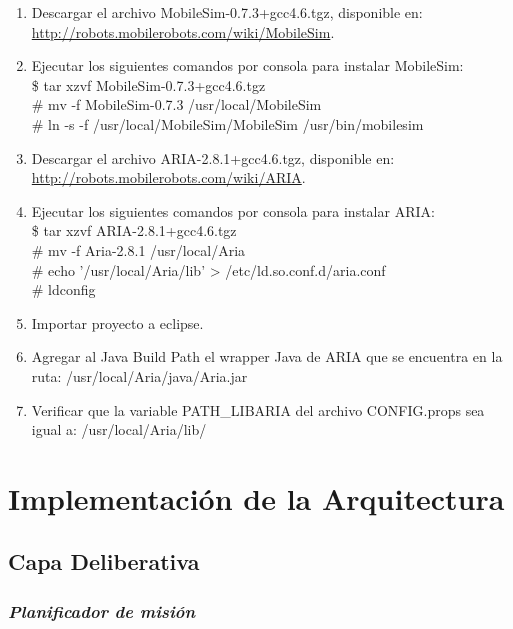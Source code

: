 \documentclass[11pt,twoside,A5]{article}
\newcommand{\sourcecode}[2][\footnotesize]{{\ttfamily#1#2}}
\newcommand{\link}[1]{{\footnotesize\url{#1}}}
\begin{document}
\begin{enumerate}
\item Descargar el archivo \sourcecode{MobileSim-0.7.3+gcc4.6.tgz}, disponible en: \\ \link{http://robots.mobilerobots.com/wiki/MobileSim}.
\item Ejecutar los siguientes comandos por consola para instalar MobileSim:
\sourcecode{ 
\\ \$ tar xzvf MobileSim-0.7.3+gcc4.6.tgz
\\ \# mv -f MobileSim-0.7.3 /usr/local/MobileSim
\\ \# ln -s -f /usr/local/MobileSim/MobileSim /usr/bin/mobilesim}
\item Descargar el archivo \sourcecode{ARIA-2.8.1+gcc4.6.tgz}, disponible en: \\ \link{http://robots.mobilerobots.com/wiki/ARIA}.
\item Ejecutar los siguientes comandos por consola para instalar ARIA:
\sourcecode{
\\ \$ tar xzvf ARIA-2.8.1+gcc4.6.tgz
\\ \# mv -f Aria-2.8.1 /usr/local/Aria
\\ \# echo '/usr/local/Aria/lib' > /etc/ld.so.conf.d/aria.conf
\\ \# ldconfig}
\item Importar proyecto a eclipse.
\item Agregar al \sourcecode{Java Build Path} el wrapper Java de ARIA que se encuentra en la ruta: \sourcecode{/usr/local/Aria/java/Aria.jar}
\item Verificar que la variable \sourcecode{PATH\_LIBARIA} del archivo \sourcecode{CONFIG.props} 
	  sea igual a: \sourcecode{/usr/local/Aria/lib/}
\end{enumerate}

\section*{Implementación de la Arquitectura}

\subsection*{Capa Deliberativa}

\subsubsection*{\textit{Planificador de misión}}
\end{document}
